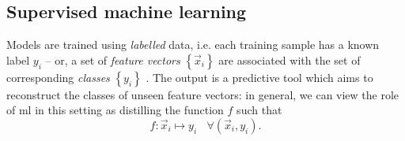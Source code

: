 \subsection{Supervised machine learning}
Models are trained using \emph{labelled} data, 
    i.e. each training sample has a known label $y_i$ -- 
    or, a set of \emph{feature vectors} $\left\{\vec{x}_i\right\}$ are associated with the set of 
    corresponding \emph{classes} $\left\{ y_i \right\}$ \cite{caruana2006empirical}. 
The output is a predictive tool which aims to reconstruct the classes of unseen feature vectors:
    in general, we can view the role of \gls{ml} in this setting as distilling the function $f$ such that 
\begin{equation}
    \label{eqn:supervised_ml_target}
    f : \vec{x}_i \longmapsto y_i \ \ \ \  \forall (\vec{x}_i, y_i).
\end{equation}
\par 

\par 

